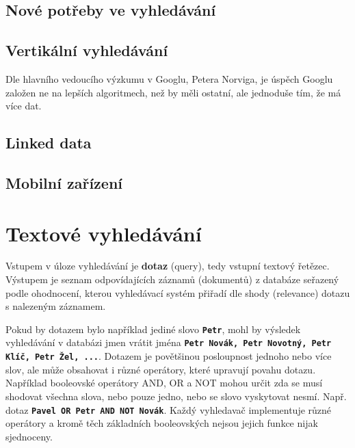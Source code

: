 \documentclass[11pt,letterpaper,oneside,openright]{book}
\newcommand{\bftt}[1]{\texttt{\textbf{#1}}}
\begin{document}

\subsection{Nové potřeby ve vyhledávání}
\subsection{Vertikální vyhledávání}
Dle hlavního vedoucího výzkumu v Googlu, Petera Norviga, je úspěch Googlu
založen ne na lepších algoritmech, než by měli ostatní, ale jednoduše tím, že
má více dat.
\subsection{Linked data}
\subsection{Mobilní zařízení}



\section{Textové vyhledávání}
Vstupem v úloze vyhledávání je \textbf{dotaz} (query), tedy vstupní textový
řetězec. Výstupem je seznam odpovídajících záznamů (dokumentů) z databáze
seřazený podle ohodnocení, kterou vyhledávací systém přiřadí dle shody
(relevance) dotazu s nalezeným záznamem.

Pokud by dotazem bylo například jediné slovo \bftt{Petr}, mohl by výsledek
vyhledávání v databázi jmen vrátit jména \bftt{Petr Novák, Petr Novotný, Petr
Klíč, Petr Žel, ...}. Dotazem je povětšinou posloupnost jednoho nebo více slov,
ale může obsahovat i různé operátory, které upravují povahu dotazu. Například
booleovské operátory AND, OR a NOT mohou určit zda se musí shodovat všechna
slova, nebo pouze jedno, nebo se slovo vyskytovat nesmí. Např. dotaz
\bftt{Pavel OR Petr AND NOT Novák}. Každý vyhledavač implementuje různé
operátory a kromě těch základních booleovských nejsou jejich funkce nijak
sjednoceny.
\end{document}
